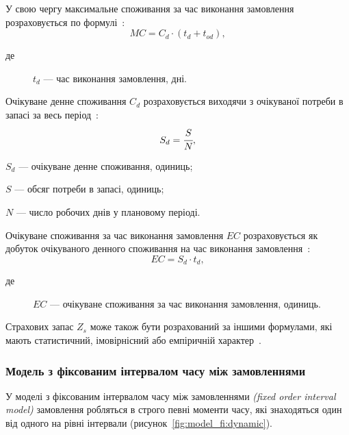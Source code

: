 У свою чергу максимальне споживання за час виконання замовлення розраховується по формулі~\cite{Sterligova2008}:
\begin{equation}
MC=C_d\cdot(t_d+t_{od})
,
\end{equation}
\begin{description}
	\item[де] $t_d$ --- час виконання замовлення, дні.
\end{description}

Очікуване денне споживання $C_d$ розраховується виходячи з очікуваної потреби в запасі за весь період~\cite{Sterligova2008}:
\begin{equation}
S_d=\cfrac{S}{N}
,
\end{equation}
\begin{description}
	\item[де] $S_d$ --- очікуване денне споживання, одиниць;
	\item $S$ --- обсяг потреби в запасі, одиниць;
	\item $N$ --- число робочих днів у плановому періоді.
\end{description}

Очікуване споживання за час виконання замовлення $EC$ розраховується як добуток очікуваного денного споживання на час виконання замовлення~\cite{Sterligova2008}:
\begin{equation}
EC=S_d\cdot t_d
,
\end{equation}
\begin{description}
	\item[де] $EC$ --- очікуване споживання за час виконання замовлення, одиниць.
\end{description}

Страхових запас $Z_s$ може також бути розрахований за іншими формулами, які мають статистичний, імовірнісний або емпіричній характер~\cite{Sterligova2008}.

\subsubsection{Модель з фіксованим інтервалом часу між замовленнями}
У моделі з фіксованим інтервалом часу між замовленнями  \textit{(fixed order interval model)} замовлення робляться в строго певні моменти часу, які знаходяться один від одного на рівні інтервали (рисунок~\ref{fig:model_fi:dynamic}).

